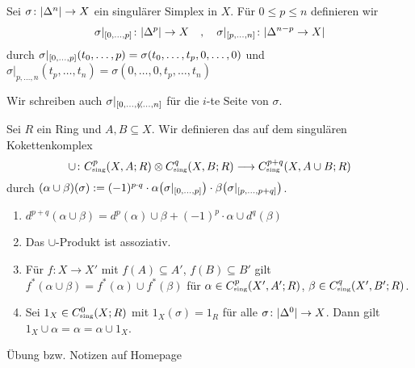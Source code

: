 \begin{definition}
	Sei $\sigma \colon \abs{\Delta^n}  \to X$ ein singulärer Simplex in $X$. Für $0 \le p \le n$ definieren wir
	\[
		\sigma|_{\benbrace*{0,\ldots ,p}} \colon \abs{\Delta^p} \to X \quad , \quad \sigma|_{\benbrace{p,\ldots ,n}} \colon \abs{\Delta^{n-p} \to X}  
	\]
	durch $\sigma|_{\benbrace*{0,\ldots ,p}}(t_0, \ldots ,p) = \sigma \enbrace*{t_0, \ldots , t_p, 0, \ldots ,0}$ und 
	$\sigma|_{p,\ldots ,n}(t_{p}, \ldots ,t_n)= \sigma(0,\ldots ,0,t_{p}, \ldots , t_n)$
\end{definition}

\begin{bemerkung}
	Wir schreiben auch $\sigma|_{\benbrace*{0,\ldots , \not i, \ldots ,n}}$ für die $i$-te Seite von $\sigma$.
\end{bemerkung}

\begin{definition}
	Sei $R$ ein Ring und $A,B \subseteq X$. Wir definieren das  auf dem singulären Kokettenkomplex 
	\[
		\cup \colon C^p_\sing \enbrace*{X,A;R} \otimes C^q_\sing(X,B;R) \longrightarrow C^{p+q}_\sing \enbrace*{X,A \cup B;R}
	\]
	durch $(\alpha \cup \beta)(\sigma) :=  (-1)^{p \cdot q} \cdot \alpha\enbrace*{\sigma|_{\benbrace{0,\ldots ,p}}} \cdot \beta \enbrace*{\sigma|_{\benbrace*{p, \ldots , p+q}}}$.
\end{definition}

\noindent{}

\begin{lemma}\leavevmode
	\begin{enumerate}[1)]
		\item $d^{p+q}(\alpha \cup \beta) = d^p(\alpha) \cup \beta + (-1)^p \cdot \alpha \cup d^q(\beta)$
		\item Das $\cup$-Produkt ist assoziativ.
		\item Für $f \colon X \to X'$ mit $f(A) \subseteq A'$, $f(B) \subseteq B'$ gilt $f^*(\alpha \cup \beta)= f^*(\alpha) \cup f^*(\beta)$ für $\alpha \in C^p_\sing(X',A';R)$, 
		$\beta \in C^q_\sing(X',B';R)$.
		\item Sei $1_X \in C_\sing^0(X;R)$ mit $1_X(\sigma)=1_R$ für alle $\sigma \colon \abs{\Delta^0} \to X$. Dann gilt $1_X \cup \alpha = \alpha = \alpha\cup 1_X$.
	\end{enumerate}
\end{lemma}
\begin{beweis}
	Übung bzw. Notizen auf Homepage 
\end{beweis}


